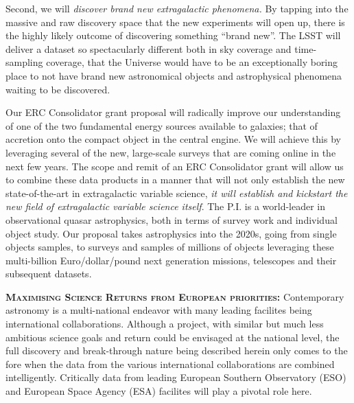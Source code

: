 \smallskip
\smallskip
\noindent
Second, we will {\it discover brand new extragalactic phenomena.}  By
tapping into the massive and raw discovery space that the new
experiments will open up, there is the highly likely outcome of
discovering something ``brand new''. The LSST will deliver a dataset
so spectacularly different both in sky coverage and time-sampling
coverage, that the Universe would have to be an exceptionally boring
place to not have brand new astronomical objects and astrophysical
phenomena waiting to be discovered.
\fi

\smallskip
\smallskip
\noindent
Our ERC Consolidator grant proposal will radically improve our
understanding of one of the two fundamental energy sources available
to galaxies; that of accretion onto the compact object in the central
engine. We will achieve this by leveraging several of the new,
large-scale surveys that are coming online in the next few years.  The
scope and remit of an ERC Consolidator grant will allow us to combine
these data products in a manner that will not only establish the new
state-of-the-art in extragalactic variable science, {\it it will
establish and kickstart the new field of extragalactic variable
science itself}.  The P.I. is a world-leader in observational quasar
astrophysics, both in terms of survey work and individual object
study.  Our proposal takes astrophysics into the 2020s, going from
single objects samples, to surveys and samples of millions of objects
leveraging these multi-billion Euro/dollar/pound next generation
missions, telescopes and their subsequent datasets.


\smallskip
\smallskip
\noindent
\textbf{\textsc{Maximising Science Returns from European priorities:}}
Contemporary astronomy is a multi-national endeavor with many leading
facilites being international collaborations. Although a project, with
similar but much less ambitious science goals and return could be
envisaged at the national level, the full discovery and break-through
nature being described herein only comes to the fore when the data
from the various international collaborations are combined
intelligently.  Critically data from leading European Southern
Observatory (ESO) and European Space Agency (ESA) facilites will play
a pivotal role here.

